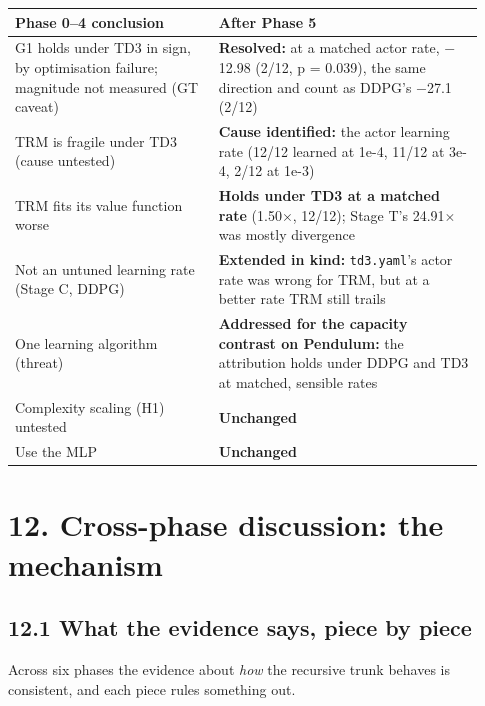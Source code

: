 \documentclass[11pt]{article}
\begin{document}
\begin{center}\small\begin{tabular}{>{\raggedright\arraybackslash}p{0.409\linewidth}>{\raggedright\arraybackslash}p{0.525\linewidth}}
\toprule
Phase 0--4 conclusion & After Phase 5 \\
\midrule
G1 holds under TD3 in sign, by optimisation failure; magnitude not measured (GT caveat) & \textbf{Resolved:} at a matched actor rate, $-$12.98 (2/12, p = 0.039), the same direction and count as DDPG's $-$27.1 (2/12) \\
TRM is fragile under TD3 (cause untested) & \textbf{Cause identified:} the actor learning rate (12/12 learned at 1e-4, 11/12 at 3e-4, 2/12 at 1e-3) \\
TRM fits its value function worse & \textbf{Holds under TD3 at a matched rate} (1.50$\times$, 12/12); Stage T's 24.91$\times$ was mostly divergence \\
Not an untuned learning rate (Stage C, DDPG) & \textbf{Extended in kind:} \texttt{td3.yaml}'s actor rate was wrong for TRM, but at a better rate TRM still trails \\
One learning algorithm (threat) & \textbf{Addressed for the capacity contrast on Pendulum:} the attribution holds under DDPG and TD3 at matched, sensible rates \\
Complexity scaling (H1) untested & \textbf{Unchanged} \\
Use the MLP & \textbf{Unchanged} \\
\bottomrule
\end{tabular}\end{center}



\medskip



\section*{12. Cross-phase discussion: the mechanism}



\subsection*{12.1 What the evidence says, piece by piece}



Across six phases the evidence about \emph{how} the recursive trunk behaves is consistent, and each piece rules something out.
\end{document}
